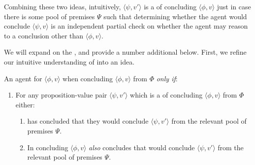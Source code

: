 \begin{note}
  Combining these two ideas, intuitively, \(\langle \psi,v' \rangle\) is a \requ{} of concluding \(\langle \phi,v \rangle\) just in case there is some pool of premises \(\Psi\) such that determining whether the agent would conclude \(\langle \psi,v \rangle\) is an independent partial check on whether the agent may reason to a conclusion other than \(\langle \phi,v \rangle\).
\end{note}

\begin{note}
  We will expand on the , and provide a number additional  below.
  First, we refine our intuitive understanding of \csN{} into an idea.
\end{note}

\begin{note}
  \begin{idea}[\csN{2}]
    \label{idea:CS:overview}
    An agent \csV{} for \(\langle \phi,v \rangle\) when concluding \(\langle \phi,v \rangle\) from \(\Phi\) \emph{only if}:
    \begin{enumerate}
    \item
      \label{idea:CS:overview:requ}
      For any proposition-value pair \(\langle \psi, v' \rangle\) which is a \requ{} of concluding \(\langle \phi,v \rangle\) from \(\Phi\) either:
      \begin{enumerate}
      \item
        \label{idea:CS:overview:requ-sat:Past}
        \vAgent{} has concluded that they would conclude \(\langle \psi, v' \rangle\) from the relevant pool of premises \(\Psi\).
      \item
        \label{idea:CS:overview:requ-sat:Pres}
        In concluding \(\langle \phi,v \rangle\) \vAgent{} \emph{also} concludes that \vAgent{} would conclude \(\langle \psi, v' \rangle\) from the relevant pool of premises \(\Psi\).
      \end{enumerate}
    \end{enumerate}
    \vspace{-\baselineskip}
  \end{idea}
\end{note}

